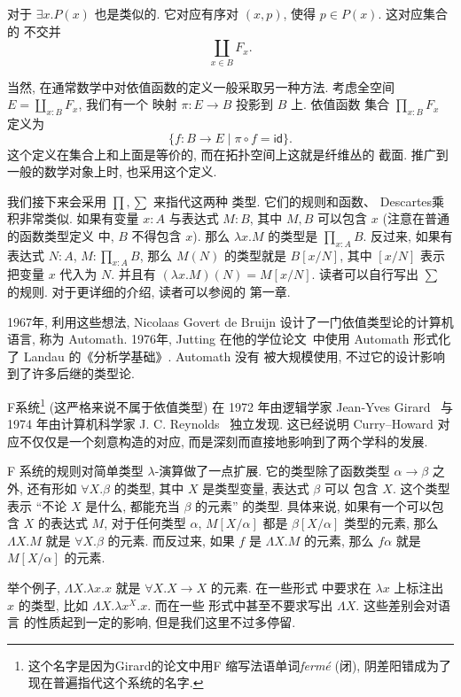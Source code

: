 \documentclass[UTF8]{ctexbook}
\newcommand{\cons}[1]{\textsf{#1}}
\theoremstyle{plain}
\theoremstyle{definition}
\theoremstyle{remark}
\begin{document}
对于 \(\exists x. P(x)\) 也是类似的. 它对应有序对
\((x, p)\), 使得 \(p \in P(x)\). 这对应集合的
不交并
\[\coprod_{x\in B} F_x.\]

当然, 在通常数学中对依值函数的定义一般采取另一种方法.
考虑全空间 \(E = \coprod_{x:B} F_x\), 我们有一个
映射 \(\pi : E \to B\) 投影到 \(B\) 上. 依值函数
集合 \(\prod_{x:B} F_x\) 定义为
\[\{f : B \to E \mid \pi \circ f = \cons{id}\}.\]
这个定义在集合上和上面是等价的, 而在拓扑空间上这就是纤维丛的
截面. 推广到一般的数学对象上时, 也采用这个定义.

我们接下来会采用 \(\prod, \sum\) 来指代这两种
类型. 它们的规则和函数、 Descartes乘积非常类似.
如果有变量 \(x : A\) 与表达式 \(M : B\), 其中
\(M, B\) 可以包含 \(x\) (注意在普通的函数类型定义
中, \(B\) 不得包含 \(x\)).
那么 \(\lambda x. M\) 的类型是 \(\prod_{x:A}B\).
反过来,
如果有表达式 \(N : A\), \(M : \prod_{x:A} B\),
那么 \(M(N)\) 的类型就是 \(B[x/N]\), 其中 \([x/N]\)
表示把变量 \(x\) 代入为 \(N\). 并且有 \((\lambda x.M)(N) = M[x/N]\).
读者可以自行写出 \(\sum\) 的规则.
对于更详细的介绍, 读者可以参阅\cite{ufp:2013:hottbook}的
第一章.

1967年, 利用这些想法, Nicolaas Govert de Bruijn
设计了一门依值类型论的计算机语言, 称为 Automath.
1976年, Jutting 在他的学位论文~\cite{automath:1994:automath}中使用 Automath
形式化了 Landau 的《分析学基础》. Automath 没有
被大规模使用, 不过它的设计影响到了许多后继的类型论.

F系统\footnote{这个名字是因为Girard的论文中用F
缩写法语单词\emph{ferm\'e} (闭), 阴差阳错成为了
现在普遍指代这个系统的名字.} (这严格来说不属于依值类型)
在 1972 年由逻辑学家 Jean-Yves Girard~\cite{girard:1972:systemf}
与 1974 年由计算机科学家 J. C. Reynolds~\cite{reynolds:1974:systemf} 独立发现.
这已经说明 Curry--Howard 对应不仅仅是一个刻意构造的对应,
而是深刻而直接地影响到了两个学科的发展.

F 系统的规则对简单类型 \(\lambda\)-演算做了一点扩展.
它的类型除了函数类型 \(\alpha \to \beta\) 之外,
还有形如 \(\forall X. \beta\) 的类型, 其中
\(X\) 是类型变量, 表达式 \(\beta\) 可以
包含 \(X\). 这个类型表示 “不论 \(X\) 是什么,
都能充当 \(\beta\) 的元素” 的类型. 具体来说,
如果有一个可以包含 \(X\) 的表达式 \(M\),
对于任何类型 \(\alpha\), \(M[X/\alpha]\) 都是
\(\beta[X/\alpha]\) 类型的元素, 那么
\(\Lambda X. M\) 就是 \(\forall X. \beta\) 的元素.
而反过来, 如果 \(f\) 是 \(\Lambda X. M\) 的元素,
那么 \(f \alpha\) 就是 \(M[X/\alpha]\) 的元素.

举个例子, \(\Lambda X. \lambda x. x\)
就是 \(\forall X. X \to X\) 的元素. 在一些形式
中要求在 \(\lambda x\) 上标注出 \(x\) 的类型,
比如 \(\Lambda X. \lambda x^X. x\). 而在一些
形式中甚至不要求写出 \(\Lambda X\). 这些差别会对语言
的性质起到一定的影响, 但是我们这里不过多停留.
\end{document}
